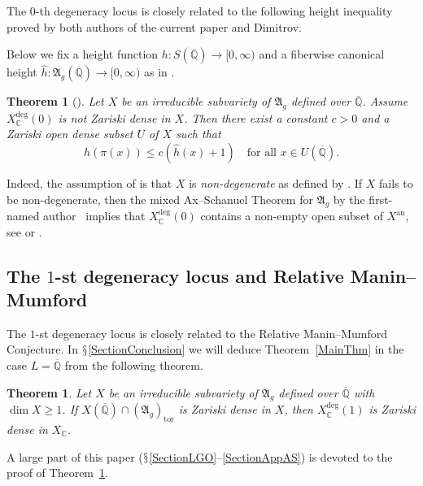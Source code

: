 \documentclass[12pt,oneside]{amsart}
\newcounter{maincounter}
\numberwithin{maincounter}{section}
\numberwithin{equation}{section}
\newtheorem{theorem}[maincounter]{Theorem}
\def\CC{\mathbb{C}}
\def\QQ{\mathbb{Q}}
\newcommand{\IC}{{\CC}}
\newcommand{\IQbar}{{\overline{\QQ}}}
\begin{document}
The $0$-th degeneracy locus  is closely related
to the following height inequality proved by both authors of the
current paper and Dimitrov.


Below we fix a height function $h\colon S(\IQbar)\rightarrow [0,\infty)$
and a fiberwise canonical height $\hat h\colon
\mathfrak{A}_g(\IQbar)\rightarrow[0,\infty)$
as in \cite{DGHUnifML}. 

\begin{theorem}[{\!\!\cite[Theorem~1.6 and Theorem~B.1]{DGHUnifML}}]\label{ThmHtInequality}
  Let $X$ be an irreducible subvariety of $\mathfrak{A}_g$ defined over $\IQbar$. Assume $X_\IC^{\mathrm{deg}}(0)$ is not Zariski dense in $X$. Then there exist a constant $c>0$ and a Zariski open dense subset $U$ of $X$ such that
  \begin{equation}\label{EqHtInequality}
    h(\pi(x)) \le c ( \hat{h}(x) + 1) \quad \text{for all }x \in U(\IQbar).
  \end{equation} 
\end{theorem}

Indeed, the assumption of \cite[Theorem~B.1]{DGHUnifML} is that $X$ is
\textit{non-degenerate} as defined by \cite[Definition~B.4]{DGHUnifML}.
If $X$ fails to be non-degenerate, then 
the mixed Ax--Schanuel Theorem for $\mathfrak{A}_g$
by the first-named author~\cite{GaoMixedAS} implies that
$X_\IC^{\mathrm{deg}}(0)$
contains a non-empty  open subset of $X^{\mathrm{an}}$, 
see \cite[Theorem~1.7]{GaoBettiRank} or 
\cite[Theorem~4.3.1]{GaoHDR}.


\subsection{The $1$-st degeneracy locus and Relative Manin--Mumford}
The $1$-st degeneracy locus %
is closely related to the Relative Manin--Mumford Conjecture. In
 $\mathsection$\ref{SectionConclusion} we will deduce Theorem~\ref{MainThm}
in the case $L=\IQbar$ from the following theorem.

\begin{theorem}\label{TheoremFirstDegLocusIsX}
Let $X$ be an irreducible subvariety of $\mathfrak{A}_g$ defined over
$\IQbar$ with $\dim X\ge 1$. If $X(\IQbar) \cap (\mathfrak{A}_g)_{\mathrm{tor}}$ is Zariski dense in $X$, then $X_\IC^{\mathrm{deg}}(1)$ is Zariski dense in $X_\IC$.
\end{theorem}
A large part of this paper
($\mathsection$\ref{SectionLGO}--\ref{SectionAppAS}) is devoted to the
proof of Theorem~\ref{TheoremFirstDegLocusIsX}.
\end{document}
